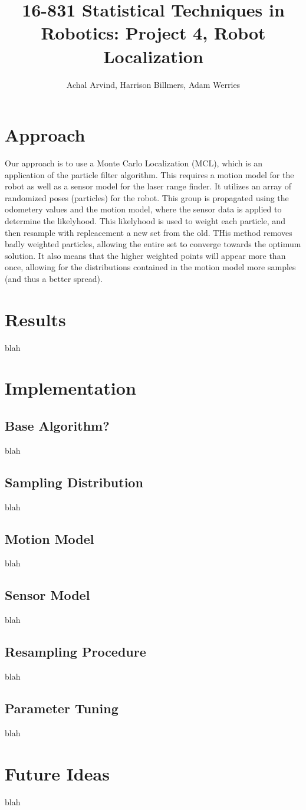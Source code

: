 \documentclass{homework}
\title{16-831 Statistical Techniques in Robotics: Project 4, Robot Localization}
\author{Achal Arvind, Harrison Billmers, Adam Werries}
\begin{document}
\maketitle

\section{Approach}
	Our approach is to use a Monte Carlo Localization (MCL), which is an application of the particle filter algorithm. This requires a motion model for the robot as well as a sensor model for the laser range finder. It utilizes an array of randomized poses (particles) for the robot. This group is propagated using the odometery values and the motion model, where the sensor data is applied to determine the likelyhood. This likelyhood is used to weight each particle, and then resample with repleacement a new set from the old. THis method removes badly weighted particles, allowing the entire set to converge towards the optimum solution. It also means that the higher weighted points will appear more than once, allowing for the distributions contained in the motion model more samples (and thus a better spread). 

\section{Results}
	blah

\section{Implementation}
	\subsection{Base Algorithm?}
		blah
	\subsection{Sampling Distribution}
		blah
	\subsection{Motion Model}
		blah
	\subsection{Sensor Model}
		blah
	\subsection{Resampling Procedure}
		blah
	\subsection{Parameter Tuning}
		blah
\section{Future Ideas}
	blah
\end{document}
